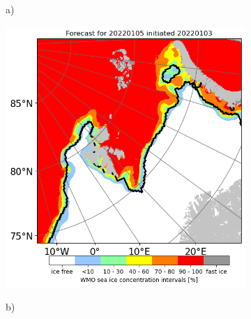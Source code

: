 \documentclass[../main/thesis]{subfiles}
\begin{document}
\begin{figure}
    \centering
    \begin{subfigure}[t]{.03\textwidth}
        a)
    \end{subfigure}
    \begin{subfigure}[t]{0.455\textwidth}
        \centering
        \includegraphics[width=\textwidth, valign=t]{unet_256_jan}
    \end{subfigure}\hfill
    \begin{subfigure}[t]{.03\textwidth}
        b)
    \end{subfigure}
    \begin{subfigure}[t]{0.455\textwidth}
        \centering

\end{subfigure}
\end{figure}
\end{document}
